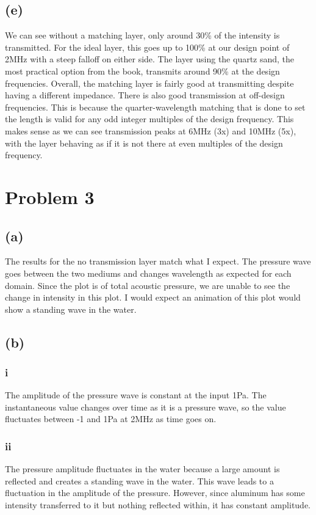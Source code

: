 \documentclass[12 pt]{article}
\begin{document}
\subsection*{(e)}
We can see without a matching layer, only around 30\% of the intensity is transmitted. For the ideal layer, this goes up
to 100\% at our design point of 2MHz with a steep falloff on either side. The layer using the quartz sand, the most
practical option from the book, transmits around 90\% at the design frequencies. Overall, the matching layer is fairly
good at transmitting despite having a different impedance. There is also good transmission at off-design frequencies.
This is because the quarter-wavelength matching that is done to set the length is valid for any odd integer multiples of
the design frequency. This makes sense as we can see transmission peaks at 6MHz (3x) and 10MHz (5x), with the layer
behaving as if it is not there at even multiples of the design frequency.

\section*{Problem 3}
\subsection*{(a)}
The results for the no transmission layer match what I expect. The pressure wave goes between the two mediums and
changes wavelength as expected for each domain. Since the plot is of total acoustic pressure, we are unable to see the
change in intensity in this plot. I would expect an animation of this plot would show a standing wave in the water.

\subsection*{(b)}
\subsubsection*{i}
The amplitude of the pressure wave is constant at the input 1Pa. The instantaneous value changes over time as it is a
pressure wave, so the value fluctuates between -1 and 1Pa at 2MHz as time goes on.

\subsubsection*{ii}
The pressure amplitude fluctuates in the water because a large amount is reflected and creates a standing wave in the
water. This wave leads to a fluctuation in the amplitude of the pressure. However, since aluminum has some intensity
transferred to it but nothing reflected within, it has constant amplitude.
\end{document}
